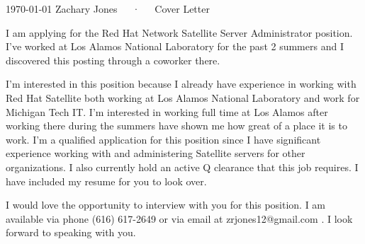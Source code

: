 \documentclass[11pt, letterpaper]{awesome-cv}
\begin{document}
\makecvheader[R]

\makecvfooter
  {\today}
  {Zachary Jones~~~·~~~Cover Letter}
  {}

\makelettertitle

\begin{cvletter}

I am applying for the Red Hat Network Satellite Server Administrator position. I’ve worked at Los Alamos National Laboratory for the past 2 summers and I discovered this posting through a coworker there.

I’m interested in this position because I already have experience in working with Red Hat Satellite both working at Los Alamos National Laboratory and work for Michigan Tech IT. I’m interested in working full time at Los Alamos after working there during the summers have shown me how great of a place it is to work. I’m a qualified application for this position since I have significant experience working with and administering Satellite servers for other organizations. I also currently hold an active Q clearance that this job requires. I have included my resume for you to look over.

I would love the opportunity to interview with you for this position. I am available via phone (616) 617-2649 or via email at zrjones12@gmail.com . I look forward to speaking with you.

\end{cvletter}


\makeletterclosing
\end{document}
